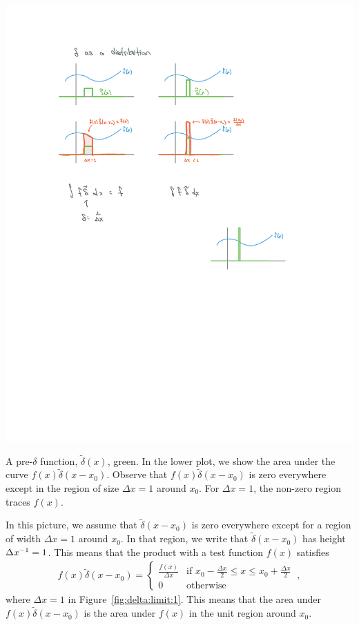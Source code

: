 \documentclass[12pt, oneside]{report}    %
\begin{document}
\begin{subappendices}
\begin{marginfigure}%
    \includegraphics[width=\textwidth]{figures/Delta_limit_01.pdf}
    \caption{A pre-$\delta$ function, $\tilde \delta(x)$, green. In the lower plot, we show the area under the curve $f(x)\tilde\delta(x-x_0)$. Observe that $f(x)\tilde\delta(x-x_0)$ is zero everywhere except in the region of size $\Delta x=1$ around $x_0$. For $\Delta x =1$, the non-zero region traces $f(x)$. }
    \label{fig:delta:limit:1}
\end{marginfigure}

In this picture, we assume that $\tilde\delta(x-x_0)$ is zero everywhere except for a region of width $\Delta x = 1$ around $x_0$. In that region, we write that $\tilde\delta(x-x_0)$ has height $\Delta x^{-1} = 1$. This means that the product with a test function $f(x)$ satisfies
\begin{align}
    f(x)\tilde\delta(x-x_0)
    =
    \begin{cases}
    \frac{f(x)}{\Delta x} &\text{if } x_0-\frac{\Delta x}{2} \leq x \leq x_0 +\frac{\Delta x}{2} \\
    0 &\text{otherwise}
    \end{cases}
    \ ,
\end{align}
where $\Delta x = 1$ in Figure~\ref{fig:delta:limit:1}. This means that the area under $f(x)\tilde\delta(x-x_0)$ is the area under $f(x)$ in the unit region around $x_0$. 


\end{subappendices}
\end{document}
